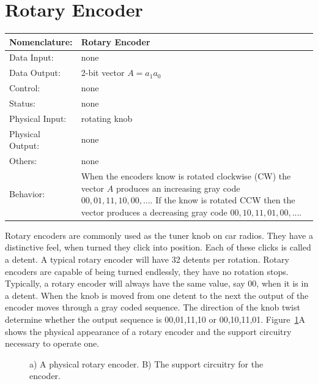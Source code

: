 \section{Rotary Encoder}
\label{page:rotary}
\begin{tabular}{|l|p{3.5in}|} \hline
Nomenclature:  & Rotary Encoder                           \\ \hline
Data Input:    & none         \\ \hline
Data Output:   & 2-bit vector $A=a_1 a_0$   \\ \hline
Control:       & none           \\ \hline
Status:        & none                                   \\ \hline
Physical Input:& rotating knob		\\ \hline
Physical Output:& none		\\ \hline
Others:        & none                   \\ \hline
Behavior:      & When the encoders know is rotated clockwise (CW) the
vector $A$ produces an increasing gray code $00, 01, 11, 10, 00, ...$.
If the know is rotated CCW then the vector produces a decreasing gray
code $00,10,11,01,00, ...$. \\ \hline
\end{tabular}

Rotary encoders are commonly used as the tuner knob on car radios.
They have a distinctive feel, when turned they click into 
position.  Each of these clicks is called a detent.   A typical
rotary encoder will have 32 detents per rotation.  Rotary encoders 
are capable of being turned endlessly,
they have no rotation stops.  Typically, a rotary encoder will always have the
same value, say 00, when it is in a detent.  When the knob is moved 
from one detent to the next the output of the encoder moves through
a gray coded sequence.  The direction of the knob twist determine whether the
output sequence is 00,01,11,10 or 00,10,11,01.    
Figure~\ref{fig:encoder}A shows the physical appearance of a rotary 
encoder and the support circuitry necessary to operate one.

\begin{figure}[ht]
\caption{a) A physical rotary encoder.  B) The support circuitry for
the encoder.}
\label{fig:encoder}
\end{figure}

